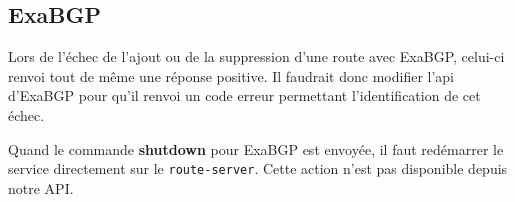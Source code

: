 \subsection{ExaBGP}
Lors de l'échec de l'ajout ou de la suppression d'une route avec ExaBGP, celui-ci renvoi tout de même une réponse positive. Il faudrait donc modifier l'api d'ExaBGP pour qu'il renvoi un code erreur permettant l'identification de cet échec.

Quand le commande \textbf{shutdown} pour ExaBGP est envoyée, il faut redémarrer le service directement sur le \verb+route-server+. Cette action n'est pas disponible depuis notre API.
